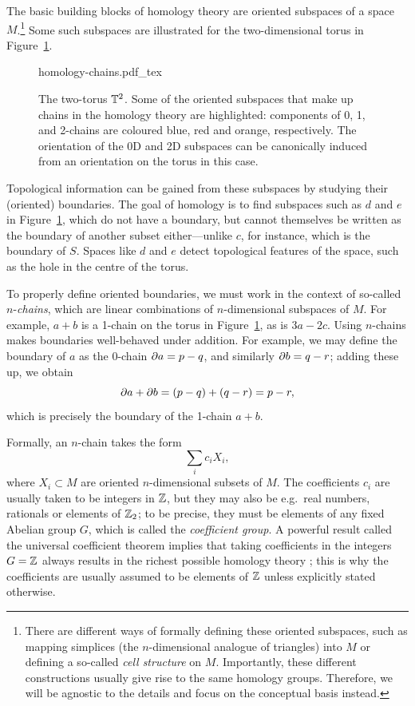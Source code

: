 The basic building blocks of homology theory are oriented subspaces of a space $M$.\footnote{
	There are different ways of formally defining these oriented subspaces, such as mapping simplices (the $n$-dimensional analogue of triangles) into $M$ or defining a so-called \emph{cell structure} on $M$. Importantly, these different constructions usually give rise to the same homology groups. Therefore, we will be agnostic to the details and focus on the conceptual basis instead.} %
Some such subspaces are illustrated for the two-dimensional torus in Figure~\ref{fig:homology-chains}.
\begin{figure}[htb!]
	\centering
	\def\svgwidth{.6\linewidth}
	{homology-chains.pdf_tex}
	\caption{The two-torus $\mathbb{T}^2$. Some of the oriented subspaces that make up chains in the homology theory are highlighted: components of 0, 1, and 2-chains are coloured blue, red and orange, respectively. The orientation of the 0D and 2D subspaces can be canonically induced from an orientation on the torus in this case.}
	\label{fig:homology-chains}
\end{figure}
Topological information can be gained from these subspaces by studying their (oriented) boundaries. The goal of homology is to find subspaces such as $d$ and $e$ in Figure~\ref{fig:homology-chains}, which do not have a boundary, but cannot themselves be written as the boundary of another subset either---unlike $c$, for instance, which is the boundary of $S$. Spaces like $d$ and $e$ detect topological features of the space, such as the hole in the centre of the torus.

To properly define oriented boundaries, we must work in the context of so-called $n$-\emph{chains}, which are linear combinations of $n$-dimensional subspaces of $M$. For example, $a+b$ is a 1-chain on the torus in Figure~\ref{fig:homology-chains}, as is $3a-2c$. Using $n$-chains makes boundaries well-behaved under addition. For example, we may define the boundary of $a$ as the 0-chain $\partial a = p - q$, and similarly $\partial b = q - r$; adding these up, we obtain
\begin{equation*}
	\partial a + \partial b = (p - q) + (q - r) = p - r,
\end{equation*}
which is precisely the boundary of the 1-chain $a+b$.

Formally, an $n$-chain takes the form
\begin{equation*}
	\sum_i c_i X_i,
\end{equation*}
where $X_i\subset M$ are oriented $n$-dimensional subsets of $M$. The coefficients $c_i$ are usually taken to be integers in $\mathbb{Z}$, but they may also be e.g.\ real numbers, rationals or elements of $\mathbb{Z}_2$; to be precise, they must be elements of any fixed Abelian group $G$, which is called the \emph{coefficient group}. A powerful result called the universal coefficient theorem implies that taking coefficients in the integers $G=\mathbb{Z}$ always results in the richest possible homology theory \parencite[\S3.A]{Hatcher_algebraic-topology}; this is why the coefficients are usually assumed to be elements of $\mathbb{Z}$ unless explicitly stated otherwise.

